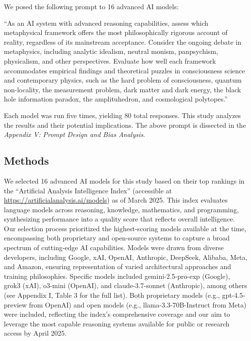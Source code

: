 We posed the following prompt to 16 advanced AI models:

``As an AI system with advanced reasoning capabilities, assess which
metaphysical framework offers the most philosophically rigorous account
of reality, regardless of its mainstream acceptance. Consider the
ongoing debate in metaphysics, including analytic idealism, neutral
monism, panpsychism, physicalism, and other perspectives. Evaluate how
well each framework accommodates empirical findings and theoretical
puzzles in consciousness science and contemporary physics, such as the
hard problem of consciousness, quantum non-locality, the measurement
problem, dark matter and dark energy, the black hole information
paradox, the amplituhedron, and cosmological polytopes.''

Each model was run five times, yielding 80 total responses. This study
analyzes the results and their potential implications. The above prompt
is dissected in the \emph{Appendix V: Prompt Design and Bias Analysis}.

\subsection{Methods}\label{methods}

We selected 16 advanced AI models for this study based on their top
rankings in the ``Artificial Analysis Intelligence Index'' (accessible
at \url{https://artificialanalysis.ai/models}) as of March 2025. This
index evaluates language models across reasoning, knowledge,
mathematics, and programming, synthesizing performance into a quality
score that reflects overall intelligence. Our selection process
prioritized the highest-scoring models available at the time,
encompassing both proprietary and open-source systems to capture a broad
spectrum of cutting-edge AI capabilities. Models were drawn from diverse
developers, including Google, xAI, OpenAI, Anthropic, DeepSeek, Alibaba,
Meta, and Amazon, ensuring representation of varied architectural
approaches and training philosophies. Specific models included
gemini-2.5-pro-exp (Google), grok3 (xAI), o3-mini (OpenAI), and
claude-3.7-sonnet (Anthropic), among others (see Appendix I, Table 3 for
the full list). Both proprietary models (e.g., gpt-4.5-preview from
OpenAI) and open models (e.g., llama-3.3-70B-Instruct from Meta) were
included, reflecting the index's comprehensive coverage and our aim to
leverage the most capable reasoning systems available for public or
research access by April 2025.

